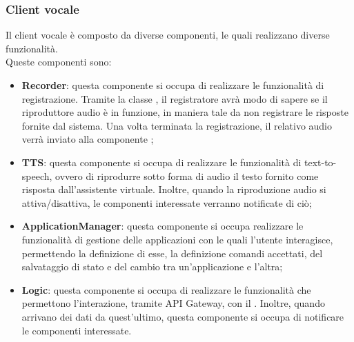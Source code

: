 \subsubsection{Client vocale}
Il client vocale è composto da diverse componenti, le quali realizzano diverse funzionalità.\\
Queste componenti sono:
\begin{itemize}
	\item \textbf{Recorder}: questa componente si occupa di realizzare le funzionalità di registrazione. Tramite la classe , il registratore avrà modo di sapere se il riproduttore audio è in funzione, in maniera tale da non registrare le risposte fornite dal sistema. Una volta terminata la registrazione, il relativo audio verrà inviato alla componente ;
	\item \textbf{TTS}: questa componente si occupa di realizzare le funzionalità di text-to-speech, ovvero di riprodurre sotto forma di audio il testo fornito come risposta dall'assistente virtuale. Inoltre, quando la riproduzione audio si attiva/disattiva, le componenti interessate verranno notificate di ciò;
	\item \textbf{ApplicationManager}: questa componente si occupa realizzare le funzionalità di gestione delle applicazioni con le quali l'utente interagisce, permettendo la definizione di esse, la definizione comandi accettati, del salvataggio di stato e del cambio tra un'applicazione e l'altra;
	\item \textbf{Logic}: questa componente si occupa di realizzare le funzionalità che permettono l'interazione, tramite API Gateway, con il . Inoltre, quando arrivano dei dati da quest'ultimo, questa componente si occupa di notificare le componenti interessate.
\end{itemize}
